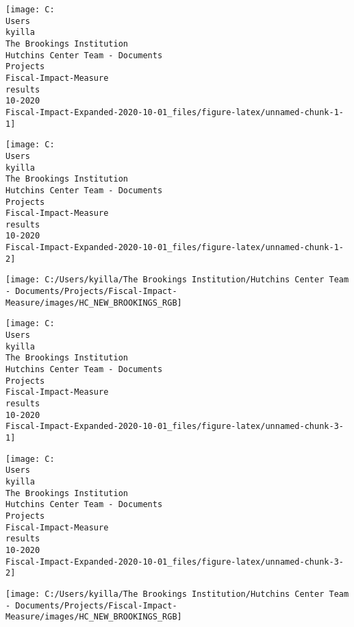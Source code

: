 \documentclass[
  9pt,
]{article}
\author{}
\date{\vspace{-2.5em}}
\begin{document}

\begin{center}\texttt{[image: C:\\Users\\kyilla\\The Brookings Institution\\Hutchins Center Team - Documents\\Projects\\Fiscal-Impact-Measure\\results\\10-2020\\Fiscal-Impact-Expanded-2020-10-01\_files/figure-latex/unnamed-chunk-1-1]} \end{center}

\begin{center}\texttt{[image: C:\\Users\\kyilla\\The Brookings Institution\\Hutchins Center Team - Documents\\Projects\\Fiscal-Impact-Measure\\results\\10-2020\\Fiscal-Impact-Expanded-2020-10-01\_files/figure-latex/unnamed-chunk-1-2]} \end{center}

\begin{flushright}\texttt{[image: C:/Users/kyilla/The Brookings Institution/Hutchins Center Team - Documents/Projects/Fiscal-Impact-Measure/images/HC\_NEW\_BROOKINGS\_RGB]} \end{flushright}

\pagebreak

\begin{center}\texttt{[image: C:\\Users\\kyilla\\The Brookings Institution\\Hutchins Center Team - Documents\\Projects\\Fiscal-Impact-Measure\\results\\10-2020\\Fiscal-Impact-Expanded-2020-10-01\_files/figure-latex/unnamed-chunk-3-1]} \end{center}

\begin{center}\texttt{[image: C:\\Users\\kyilla\\The Brookings Institution\\Hutchins Center Team - Documents\\Projects\\Fiscal-Impact-Measure\\results\\10-2020\\Fiscal-Impact-Expanded-2020-10-01\_files/figure-latex/unnamed-chunk-3-2]} \end{center}

\begin{flushright}\texttt{[image: C:/Users/kyilla/The Brookings Institution/Hutchins Center Team - Documents/Projects/Fiscal-Impact-Measure/images/HC\_NEW\_BROOKINGS\_RGB]} \end{flushright}
\end{document}
